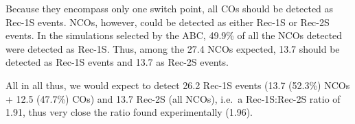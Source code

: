 Because they encompass only one switch point, all COs should be detected as Rec-1S events.
NCOs, however, could be detected as either Rec-1S or Rec-2S events. 
In the simulations selected by the ABC, 49.9\% of all the NCOs detected were detected as Rec-1S. 
Thus, among the 27.4 NCOs expected, 13.7 should be detected as Rec-1S events and 13.7 as Rec-2S events. 

All in all thus, we would expect to detect 26.2 Rec-1S events (13.7 (52.3\%) NCOs + 12.5 (47.7\%) COs) and 13.7 Rec-2S (all NCOs), i.e.\ a Rec-1S:Rec-2S ratio of 1.91, thus very close the ratio found experimentally (1.96).




